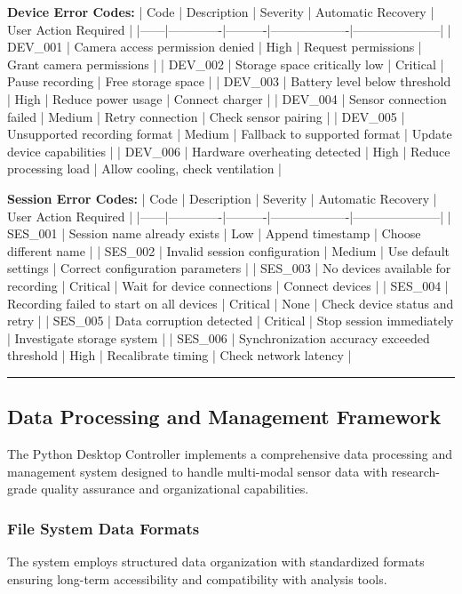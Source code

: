 \documentclass[12pt,a4paper]{article}
\begin{document}
\textbf{Device Error Codes:}
| Code | Description | Severity | Automatic Recovery | User Action Required |
|------|-------------|----------|-------------------|---------------------|
| DEV\_001 | Camera access permission denied | High | Request permissions | Grant camera permissions |
| DEV\_002 | Storage space critically low | Critical | Pause recording | Free storage space |
| DEV\_003 | Battery level below threshold | High | Reduce power usage | Connect charger |
| DEV\_004 | Sensor connection failed | Medium | Retry connection | Check sensor pairing |
| DEV\_005 | Unsupported recording format | Medium | Fallback to supported format | Update device capabilities |
| DEV\_006 | Hardware overheating detected | High | Reduce processing load | Allow cooling, check ventilation |

\textbf{Session Error Codes:}
| Code | Description | Severity | Automatic Recovery | User Action Required |
|------|-------------|----------|-------------------|---------------------|
| SES\_001 | Session name already exists | Low | Append timestamp | Choose different name |
| SES\_002 | Invalid session configuration | Medium | Use default settings | Correct configuration parameters |
| SES\_003 | No devices available for recording | Critical | Wait for device connections | Connect devices |
| SES\_004 | Recording failed to start on all devices | Critical | None | Check device status and retry |
| SES\_005 | Data corruption detected | Critical | Stop session immediately | Investigate storage system |
| SES\_006 | Synchronization accuracy exceeded threshold | High | Recalibrate timing | Check network latency |

\hrule

\subsection{Data Processing and Management Framework}

The Python Desktop Controller implements a comprehensive data processing and management system designed to handle
multi-modal sensor data with research-grade quality assurance and organizational capabilities.

\subsubsection{File System Data Formats}

The system employs structured data organization with standardized formats ensuring long-term accessibility and
compatibility with analysis tools.
\end{document}
